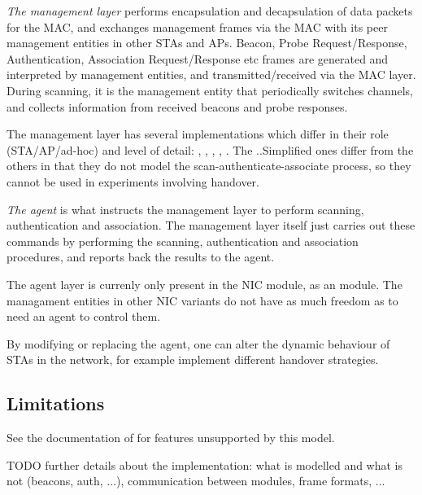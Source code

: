 \textit{The management layer} performs encapsulation and decapsulation of data packets
for the MAC, and exchanges management frames via the MAC with its peer
management entities in other STAs and APs. Beacon, Probe Request/Response,
Authentication, Association Request/Response etc frames are generated
and interpreted by management entities, and transmitted/received via
the MAC layer. During scanning, it is the management entity that periodically
switches channels, and collects information from received beacons and
probe responses.

The management layer has several implementations which differ in their role
(STA/AP/ad-hoc) and level of detail: ,
, , ,
. The ..Simplified ones differ from the others
in that they do not model the scan-authenticate-associate process,
so they cannot be used in experiments involving handover.

\textit{The agent} is what instructs the management layer to perform
scanning, authentication and association. The management layer itself
just carries out these commands by performing the scanning, authentication
and association procedures, and reports back the results to the agent.

The agent layer is currenly only present in the  NIC module,
as an  module. The managament entities in other NIC
variants do not have as much freedom as to need an agent to control them.

By modifying or replacing the agent, one can alter the dynamic behaviour
of STAs in the network, for example implement different handover strategies.

\subsection{Limitations}

See the documentation of  for features unsupported by this
model.

TODO further details about the implementation: what is modelled and what is
 not (beacons, auth, ...), communication between modules, frame formats,
 ...





